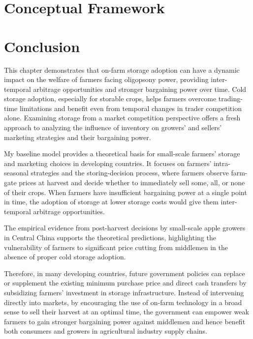\documentclass[12pt,authoryear, notitlepage]{elegantpaper}
\begin{document}
\section{Conceptual Framework}
    




    


\section{Conclusion}
\noindent This chapter demonstrates that on-farm storage adoption can have a dynamic impact on the welfare of farmers facing oligopsony power, providing inter-temporal arbitrage opportunities and stronger bargaining power over time. Cold storage adoption, especially for storable crops, helps farmers overcome trading-time limitations and benefit even from temporal changes in trader competition alone. Examining storage from a market competition perspective offers a fresh approach to analyzing the influence of inventory on growers' and sellers' marketing strategies and their bargaining power.

My baseline model provides a theoretical basis for small-scale farmers' storage and marketing choices in developing countries. It focuses on farmers' intra-seasonal strategies and the storing-decision process, where farmers observe farm-gate prices at harvest and decide whether to immediately sell some, all, or none of their crops. When farmers have insufficient bargaining power at a single point in time, the adoption of storage at lower storage costs would give them inter-temporal arbitrage opportunities. 

The empirical evidence from post-harvest decisions by small-scale apple growers in Central China supports the theoretical predictions, highlighting the vulnerability of farmers to significant price cutting from middlemen in the absence of proper cold storage adoption. 

Therefore, in many developing countries, future government policies can replace or supplement the existing minimum purchase price and direct cash transfers by subsidizing farmers' investment in storage infrastructure. Instead of intervening directly into markets, by encouraging the use of on-farm technology in a broad sense to sell their harvest at an optimal time, the government can empower weak farmers to gain stronger bargaining power against middlemen and hence benefit both consumers and growers in agricultural industry supply chains.
\end{document}
